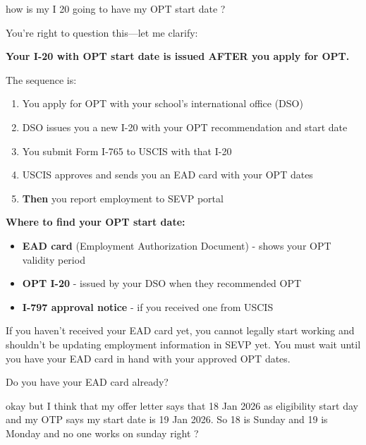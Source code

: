 \begin{userprompt}
how is my I 20 going to have my OPT start date ?
\end{userprompt}

\begin{botresponse}
You're right to question this—let me clarify:

\textbf{Your I-20 with OPT start date is issued AFTER you apply for OPT.}

The sequence is:

\begin{enumerate}
\item You apply for OPT with your school's international office (DSO)
\item DSO issues you a new I-20 with your OPT recommendation and start date
\item You submit Form I-765 to USCIS with that I-20
\item USCIS approves and sends you an EAD card with your OPT dates
\item \textbf{Then} you report employment to SEVP portal
\end{enumerate}

\textbf{Where to find your OPT start date:}

\begin{itemize}
\item \textbf{EAD card} (Employment Authorization Document) - shows your OPT validity period
\item \textbf{OPT I-20} - issued by your DSO when they recommended OPT
\item \textbf{I-797 approval notice} - if you received one from USCIS
\end{itemize}

If you haven't received your EAD card yet, you cannot legally start working and shouldn't be updating employment information in SEVP yet. You must wait until you have your EAD card in hand with your approved OPT dates.

Do you have your EAD card already?
\end{botresponse}

\begin{userprompt}
okay but I think that my offer letter says that 18 Jan 2026 as eligibility start day and my OTP says my start date is 19 Jan 2026. So 18 is Sunday and 19 is Monday and no one works on sunday right ?
\end{userprompt}

